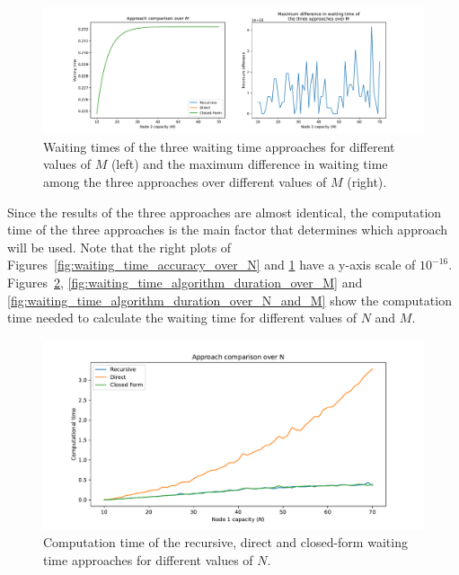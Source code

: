 \begin{figure}[H]
    \includegraphics[width=\textwidth]{chapters/03_queueing_model/img/numeric_results_and_timings/waiting_time_formulas_comparison/waiting_time_over_M.pdf}
    \caption{Waiting times of the three waiting time approaches for different
    values of \(M\) (left) and the maximum difference in waiting time among
    the three approaches over different values of \(M\) (right).}
    \label{fig:waiting_time_accuracy_over_M}
\end{figure}


Since the results of the three approaches are almost identical, the computation
time of the three approaches is the main factor that determines which
approach will be used.
Note that the right plots of Figures~\ref{fig:waiting_time_accuracy_over_N} and
\ref{fig:waiting_time_accuracy_over_M} have a y-axis scale of \(10^{-16}\).
Figures~\ref{fig:waiting_time_algorithm_duration_over_N},
\ref{fig:waiting_time_algorithm_duration_over_M} and
\ref{fig:waiting_time_algorithm_duration_over_N_and_M} show the computation
time needed to calculate the waiting time for different values of \(N\) and
\(M\).

\begin{figure}[H]
    \includegraphics[width=\textwidth]{chapters/03_queueing_model/img/numeric_results_and_timings/waiting_time_formulas_comparison/algorithm_duration_over_N.pdf}
    \caption{Computation time of the recursive, direct and closed-form waiting
    time approaches for different values of \(N\).}
    \label{fig:waiting_time_algorithm_duration_over_N}
\end{figure}

